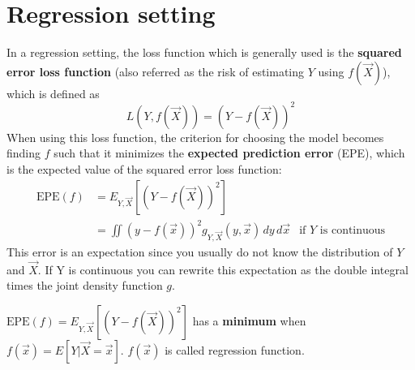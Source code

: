   \section{Regression setting}
    In a regression setting, the loss function which is generally used is the \textbf{squared error loss function} (also referred as the risk of estimating $ Y $ using $ f(\vec{X}) $), which is defined as
    $$L(Y,f(\vec{X})) = (Y-f(\vec{X}))^2$$
    When using this loss function, the criterion for choosing the model becomes finding $f$ such that it minimizes the \textbf{expected prediction error} (EPE), which is the expected value of the squared error loss function:
    \begin{align*}
      \text{EPE}(f) & = E_{Y,\vec{X}}[(Y-f(\vec{X}))^2] \\
                    & = \iint (y - f(\vec{x}))^2 g_{Y,\vec{X}}(y, \vec{x})\,dy\,d\vec{x} & \text{if } Y \text{ is continuous}
    \end{align*}
    This error is an expectation since you usually do not know the distribution of $Y$ and $\vec{X}$.
    If Y is continuous you can rewrite this expectation as the double integral times the joint density function $g$.\\
    
    \begin{theorem}
      $\text{EPE}(f) = E_{Y,\vec{X}}[(Y-f(\vec{X}))^2]$ has a \textbf{minimum} when 
      $f(\vec{x}) = E[Y|\vec{X} = \vec{x}]$.
      $f(\vec{x})$ is called regression function.
    \end{theorem}

